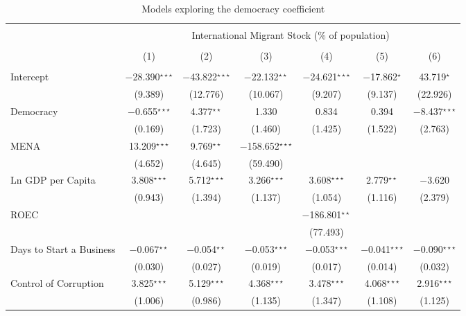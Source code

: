 \documentclass[../main.tex]{subfiles}
\begin{document}
\begin{table}[H] \centering
\scriptsize
\caption{Models exploring the democracy coefficient} 
 \label{tab:2} 
\begin{tabular}{@{\extracolsep{5pt}}lcccccc} 
\toprule
\\[-1.8ex] & \multicolumn{6}{c}{International Migrant Stock (\% of population)} \\ 
\\[-1.8ex] & (1) & (2) & (3) & (4) & (5) & (6)\\ 
\midrule \\[-1.8ex] 
 Intercept & $-$28.390$^{\star\star\star}$ & $-$43.822$^{\star\star\star}$ & $-$22.132$^{\star\star}$ & $-$24.621$^{\star\star\star}$ & $-$17.862$^{\star}$ & 43.719$^{\star}$ \\ 
  & (9.389) & (12.776) & (10.067) & (9.207) & (9.137) & (22.926) \\ 
  Democracy & $-$0.655$^{\star\star\star}$ & 4.377$^{\star\star}$ & 1.330 & 0.834 & 0.394 & $-$8.437$^{\star\star\star}$ \\ 
  & (0.169) & (1.723) & (1.460) & (1.425) & (1.522) & (2.763) \\ 
  MENA & 13.209$^{\star\star\star}$ & 9.769$^{\star\star}$ & $-$158.652$^{\star\star\star}$ &  &  &  \\ 
  & (4.652) & (4.645) & (59.490) &  &  &  \\ 
  Ln GDP per Capita & 3.808$^{\star\star\star}$ & 5.712$^{\star\star\star}$ & 3.266$^{\star\star\star}$ & 3.608$^{\star\star\star}$ & 2.779$^{\star\star}$ & $-$3.620 \\ 
  & (0.943) & (1.394) & (1.137) & (1.054) & (1.116) & (2.379) \\ 
  ROEC &  &  &  & $-$186.801$^{\star\star}$ &  &  \\ 
  &  &  &  & (77.493) &  &  \\ 
  Days to Start a Business & $-$0.067$^{\star\star}$ & $-$0.054$^{\star\star}$ & $-$0.053$^{\star\star\star}$ & $-$0.053$^{\star\star\star}$ & $-$0.041$^{\star\star\star}$ & $-$0.090$^{\star\star\star}$ \\ 
  & (0.030) & (0.027) & (0.019) & (0.017) & (0.014) & (0.032) \\ 
  Control of Corruption & 3.825$^{\star\star\star}$ & 5.129$^{\star\star\star}$ & 4.368$^{\star\star\star}$ & 3.478$^{\star\star\star}$ & 4.068$^{\star\star\star}$ & 2.916$^{\star\star\star}$ \\ 
  & (1.006) & (0.986) & (1.135) & (1.347) & (1.108) & (1.125) \\ 

\end{tabular}
\end{table}
\end{document}
